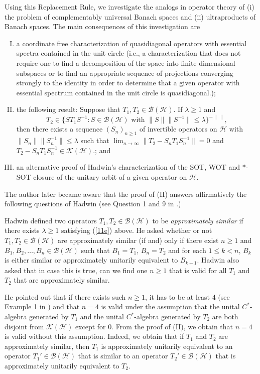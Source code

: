 \documentclass[11pt]{amsart}
\theoremstyle{definition}
\numberwithin{equation}{section}
\begin{document}
Using this Replacement Rule, we investigate the analogs in operator theory of (i) the problem of complementably universal Banach spaces and (ii) ultraproducts of Banach
spaces. The main consequences of this investigation are
\begin{enumerate}[(I)]
\item a coordinate free characterization of quasidiagonal operators with essential spectra contained in the unit circle (i.e., a characterization that does not require one
to find a decomposition of the space into finite dimensional subspaces or to find an appropriate sequence of projections converging strongly to the identity in order to
determine that a given operator with essential spectrum contained in the unit circle is quasidiagonal.);
\item the following result: Suppose that $T_{1},T_{2}\in\mathcal{B(H)}$. If $\lambda\geq 1$ and
\begin{equation}\label{11e}
T_{2}\in\{ST_{1}S^{-1}:S\in\mathcal{B(H)}\text{ with }\|S\|\|S^{-1}\|\leq\lambda\}^{-\|\,\|},
\end{equation}
then there exists a sequence $(S_{n})_{n\geq 1}$ of invertible operators on $\mathcal{H}$ with $\|S_{n}\|\|S_{n}^{-1}\|\leq\lambda$ such that $\displaystyle\lim_{n\to
\infty}\|T_{2}-S_{n}T_{1}S_{n}^{-1}\|=0$ and $T_{2}-S_{n}T_{1}S_{n}^{-1}\in\mathcal{K(H)}$.;
and
\item an alternative proof of Hadwin's characterization \cite{Hadwin2} of the SOT, WOT and $*$-SOT closure of the unitary orbit of a given operator on $\mathcal{H}$.
\end{enumerate}
The author later became aware that the proof of (II) answers affirmatively the following questions of Hadwin (see Question 1 and 9 in \cite{Hadwin3}.)

Hadwin defined two operators $T_{1},T_{2}\in\mathcal{B(H)}$ to be {\it approximately similar} if there exists $\lambda\geq 1$ satisfying (\ref{11e}) above. He asked
whether or not $T_{1},T_{2}\in\mathcal{B(H)}$ are approximately similar (if and) only if there exist $n\geq 1$ and $B_{1},B_{2},\ldots,B_{n}\in\mathcal{B(H)}$ such that
$B_{1}=T_{1}$, $B_{n}=T_{2}$ and for each $1\leq k<n$, $B_{k}$ is either similar or approximately unitarily equivalent to $B_{k+1}$. Hadwin also asked that in case this is
true, can we find one $n\geq 1$ that is valid for all $T_{1}$ and $T_{2}$ that are approximately similar.

He pointed out that if there exists such $n\geq 1$, it has to be at least 4 (see Example 1 in \cite{Hadwin3}) and that $n=4$ is valid under the assumption that the unital
$C^{*}$-algebra generated by $T_{1}$ and the unital $C^{*}$-algebra generated by $T_{2}$ are both disjoint from $\mathcal{K(H)}$ except for 0. From the proof of (II), we
obtain that $n=4$ is valid without this assumption. Indeed, we obtain that if $T_{1}$ and $T_{2}$ are approximately similar, then $T_{1}$ is approximately unitarily
equivalent to an operator $T_{1}'\in\mathcal{B(H)}$ that is similar to an operator $T_{2}'\in\mathcal{B(H)}$ that is approximately unitarily equivalent to $T_{2}$.
\end{document}
